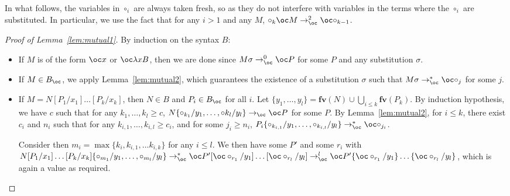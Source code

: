 \documentclass[10pt,a4paper]{article}
\newcommand{\<}{\langle}
\renewcommand{\>}{\rangle}
\newcommand{\fv}{\mathbf{fv}}
\newcommand{\todbf}{\to_{\oc}} %
\begin{document}
In what follows, the variables in $\circ_i$ are always taken fresh, so as they
do not interfere with variables in the terms where the $\circ_i$ are
substituted. In particular, we use the fact that for any $i>1$ and any $M$, $\circ_k \oc
M\todbf^2\oc\circ_{k-1}$.

\begin{proof}[Proof of Lemma~\ref{lem:mutual1}]
	By induction on the syntax $B$:
	\begin{itemize}
		\item If $M$ is of the form $\oc x$ or $\oc\lambda xB$, then we are
			done since $M\sigma\todbf^0 \oc P$ for some $P$ and any
			substitution $\sigma$.
		\item If $M\in B_\oc$, we apply Lemma~\ref{lem:mutual2},
			which guarantees the existence of a substitution $\sigma$
			such that $M\sigma\todbf^*\oc\circ_j$ for some $j$.
		\item If $M=N[P_1/x_1]\dots [P_k/x_k]$, then $N\in B$ and $P_i\in
			B_\oc$ for all $i$. Let $\{y_1,\dots ,y_l\}=\fv(N)\cup\bigcup_{i\leq
			k}\fv(P_k)$. By induction hypothesis, we have
			$c$ such that for any $k_1,\dots ,k_l\geq c$,
			$N\{\circ_{k_1}/y_1,\dots ,\circ{k_l}/y_l\}\todbf \oc P$ for
			some $P$. By Lemma~\ref{lem:mutual2},
			for $i\leq k$, there exist $c_i$
			and $n_i$ such that for any $k_{i,1},\dots ,k_{i,l}\geq c_i$,
			and for some $j_i\geq n_i$,
			$P_i\{\circ_{k_{i,1}}/y_1,\dots ,\circ_{k_{i,l}}/y_l\}\todbf^*\oc\circ_{j_i}$.

			Consider then $m_i=\max\{k_i,k_{i,1},\dots k_{i,k}\}$ for any
			$i\leq l$. We then have some $P'$ and some $r_i$ with
			$N[P_1/x_1]\dots [P_k/x_k]\{\circ_{m_1}/y_1,\dots ,\circ_{m_l}/y_l\}\todbf^*
			\oc P' [\oc\circ_{r_1}/y_1]\dots [\oc\circ_{r_l}/y_l]\todbf^l 
			\oc P' \{\oc\circ_{r_1}/y_1\}\dots \{\oc\circ_{r_l}/y_l\}$,
			which is again a value as required. \qedhere
	\end{itemize}
\end{proof}
\end{document}
